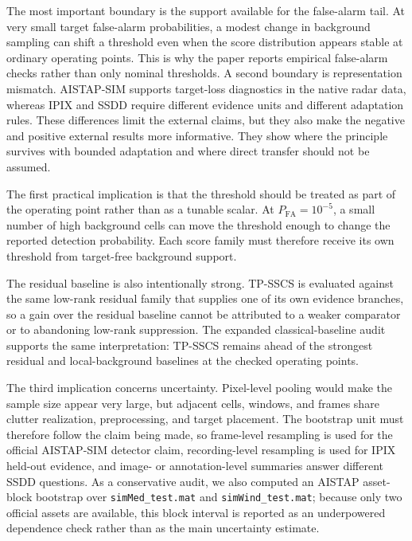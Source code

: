 \documentclass[journal]{IEEEtran}
\begin{document}
The most important boundary is the support available for the false-alarm tail. At very small target false-alarm probabilities, a modest change in background sampling can shift a threshold even when the score distribution appears stable at ordinary operating points. This is why the paper reports empirical false-alarm checks rather than only nominal thresholds. A second boundary is representation mismatch. AISTAP-SIM supports target-loss diagnostics in the native radar data, whereas IPIX and SSDD require different evidence units and different adaptation rules. These differences limit the external claims, but they also make the negative and positive external results more informative. They show where the principle survives with bounded adaptation and where direct transfer should not be assumed.

The first practical implication is that the threshold should be treated as part of the operating point rather than as a tunable scalar. At $P_{\mathrm{FA}}=10^{-5}$, a small number of high background cells can move the threshold enough to change the reported detection probability. Each score family must therefore receive its own threshold from target-free background support.

The residual baseline is also intentionally strong. TP-SSCS is evaluated against the same low-rank residual family that supplies one of its own evidence branches, so a gain over the residual baseline cannot be attributed to a weaker comparator or to abandoning low-rank suppression. The expanded classical-baseline audit supports the same interpretation: TP-SSCS remains ahead of the strongest residual and local-background baselines at the checked operating points.

The third implication concerns uncertainty. Pixel-level pooling would make the sample size appear very large, but adjacent cells, windows, and frames share clutter realization, preprocessing, and target placement. The bootstrap unit must therefore follow the claim being made, so frame-level resampling is used for the official AISTAP-SIM detector claim, recording-level resampling is used for IPIX held-out evidence, and image- or annotation-level summaries answer different SSDD questions. As a conservative audit, we also computed an AISTAP asset-block bootstrap over \texttt{simMed\_test.mat} and \texttt{simWind\_test.mat}; because only two official assets are available, this block interval is reported as an underpowered dependence check rather than as the main uncertainty estimate.
\end{document}
